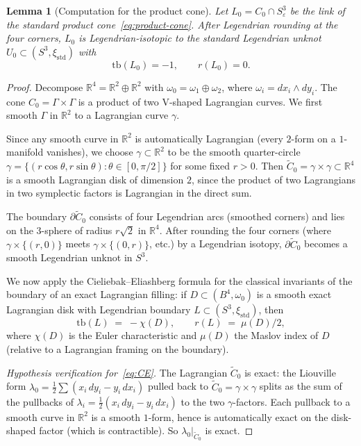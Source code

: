 \documentclass[12pt]{article}
\newtheorem{lemma}[theorem]{Lemma}
\theoremstyle{definition}
\begin{document}
\begin{lemma}[Computation for the product cone]\label{lem:invariants}
Let $L_0=C_0\cap S^3_\varepsilon$ be the link of the standard product cone~\eqref{eq:product-cone}. After Legendrian rounding at the four corners, $L_0$ is Legendrian-isotopic to the standard Legendrian unknot $U_0\subset(S^3,\xi_{\mathrm{std}})$ with
\begin{equation}\label{eq:tb-r}
\mathrm{tb}(L_0)=-1,\qquad r(L_0)=0.
\end{equation}
\end{lemma}

\begin{proof}
Decompose $\mathbb{R}^4=\mathbb{R}^2\oplus\mathbb{R}^2$ with $\omega_0=\omega_1\oplus\omega_2$, where $\omega_i=dx_i\wedge dy_i$. The cone $C_0=\Gamma\times\Gamma$ is a product of two V-shaped Lagrangian curves. We first smooth $\Gamma$ in $\mathbb{R}^2$ to a Lagrangian curve $\gamma$.

Since any smooth curve in $\mathbb{R}^2$ is automatically Lagrangian (every $2$-form on a $1$-manifold vanishes), we choose $\gamma\subset\mathbb{R}^2$ to be the smooth quarter-circle $\gamma=\{(r\cos\theta,r\sin\theta):\theta\in[0,\pi/2]\}$ for some fixed $r>0$. Then $\widetilde{C}_0=\gamma\times\gamma\subset\mathbb{R}^4$ is a smooth Lagrangian disk of dimension $2$, since the product of two Lagrangians in two symplectic factors is Lagrangian in the direct sum.

The boundary $\partial\widetilde{C}_0$ consists of four Legendrian arcs (smoothed corners) and lies on the $3$-sphere of radius $r\sqrt{2}$ in $\mathbb{R}^4$. After rounding the four corners (where $\gamma\times\{(r,0)\}$ meets $\gamma\times\{(0,r)\}$, etc.) by a Legendrian isotopy, $\partial\widetilde{C}_0$ becomes a smooth Legendrian unknot in $S^3$.

We now apply the Cieliebak--Eliashberg formula for the classical invariants of the boundary of an exact Lagrangian filling: if $D\subset(B^4,\omega_0)$ is a smooth exact Lagrangian disk with Legendrian boundary $L\subset(S^3,\xi_{\mathrm{std}})$, then
\begin{equation}\label{eq:CE}
\mathrm{tb}(L) \;=\; -\chi(D),\qquad r(L) \;=\; \mu(D)/2,
\end{equation}
where $\chi(D)$ is the Euler characteristic and $\mu(D)$ the Maslov index of $D$ (relative to a Lagrangian framing on the boundary).

\smallskip\noindent\emph{Hypothesis verification for~\eqref{eq:CE}.} The Lagrangian $\widetilde{C}_0$ is exact: the Liouville form $\lambda_0=\tfrac{1}{2}\sum(x_i\,dy_i-y_i\,dx_i)$ pulled back to $\widetilde{C}_0=\gamma\times\gamma$ splits as the sum of the pullbacks of $\lambda_i=\tfrac{1}{2}(x_i\,dy_i-y_i\,dx_i)$ to the two $\gamma$-factors. Each pullback to a smooth curve in $\mathbb{R}^2$ is a smooth $1$-form, hence is automatically exact on the disk-shaped factor (which is contractible). So $\lambda_0|_{\widetilde{C}_0}$ is exact.


\end{proof}
\end{document}
